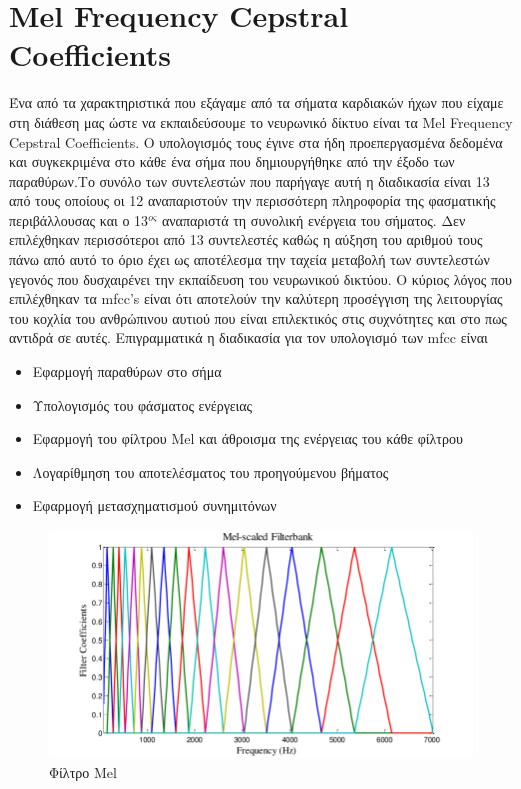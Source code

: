 \section{Mel Frequency Cepstral Coefficients}
Ένα από τα χαρακτηριστικά που εξάγαμε από τα σήματα καρδιακών ήχων που είχαμε στη διάθεση
μας ώστε να εκπαιδεύσουμε το νευρωνικό δίκτυο είναι τα Mel Frequency Cepstral Coefficients.
Ο υπολογισμός τους έγινε στα ήδη προεπεργασμένα δεδομένα και συγκεκριμένα στο κάθε ένα
σήμα που δημιουργήθηκε από την έξοδο των παραθύρων.Το συνόλο των συντελεστών που παρήγαγε
αυτή η διαδικασία είναι 13 από τους οποίους οι 12 αναπαριστούν την περισσότερη πληροφορία
της φασματικής περιβάλλουσας και ο 13$^{ος}$ αναπαριστά τη συνολική ενέργεια του σήματος.
Δεν επιλέχθηκαν περισσότεροι από 13 συντελεστές καθώς η αύξηση του αριθμού τους πάνω
από αυτό το όριο έχει ως αποτέλεσμα την ταχεία μεταβολή των συντελεστών γεγονός που
δυσχαιρένει την εκπαίδευση του νευρωνικού δικτύου. Ο κύριος λόγος που επιλέχθηκαν τα
mfcc's είναι ότι αποτελούν την καλύτερη προσέγγιση της λειτουργίας του κοχλία του
ανθρώπινου αυτιού που είναι επιλεκτικός στις συχνότητες και στο πως αντιδρά σε αυτές.
Επιγραμματικά η διαδικασία για τον υπολογισμό των mfcc είναι
\begin{center}
    \begin{itemize}
        \item Εφαρμογή παραθύρων στο σήμα
        \item Υπολογισμός του φάσματος ενέργειας
        \item Εφαρμογή του φίλτρου Mel και άθροισμα της ενέργειας του κάθε φίλτρου
        \item Λογαρίθμηση του αποτελέσματος του προηγούμενου βήματος
        \item Εφαρμογή μετασχηματισμού συνημιτόνων
    \end{itemize}
\end{center}

\begin{figure}
    \begin{center}
        \includegraphics{images/MelFilter.png}
        \caption{Φίλτρο Mel}
        \label{melfilter}
    \end{center}
\end{figure}



